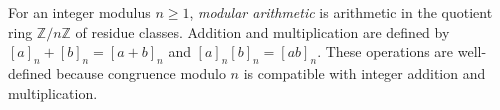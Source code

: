 
For an integer modulus $n\ge1$, \emph{modular arithmetic} is arithmetic in the quotient ring $\mathbb Z/n\mathbb Z$ of residue classes. Addition and multiplication are defined by $[a]_n+[b]_n=[a+b]_n$ and $[a]_n[b]_n=[ab]_n$. These operations are well-defined because congruence modulo $n$ is compatible with integer addition and multiplication.
